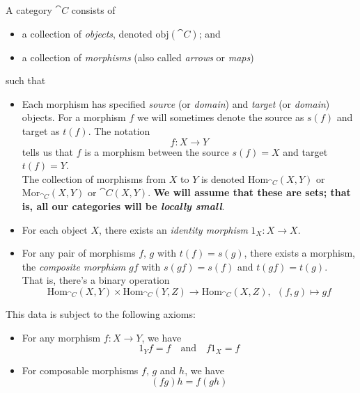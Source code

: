 \vspace*{1em}

\begin{definition}
A category $\cat{C}$ consists of
\begin{itemize}
\item a collection of \emph{objects}, denoted $\mathrm{obj}(\cat{C})$; and
\item a collection of \emph{morphisms} (also called \emph{arrows} or \emph{maps})
\end{itemize}
such that
\begin{itemize}
\item Each morphism has specified \emph{source} (or \emph{domain}) and \emph{target} (or \emph{domain}) objects. For a morphism $f$ we will sometimes denote the source as $s(f)$ and target as $t(f)$. The notation \[f:X \to Y\] tells us that $f$ is a morphism between the source $s(f) = X$ and target $t(f) = Y$.\\[0.5em]
The collection of morphisms from $X$ to $Y$ is denoted $\mathrm{Hom}_{\cat{C}}(X,Y)$ or $\mathrm{Mor}_{\cat{C}}(X,Y)$ or $\cat{C}(X,Y)$. {\bf We will assume that these are sets; that is, all our categories will be \emph{locally small}}.
\item For each object $X$, there exists an \emph{identity morphism} $1_X: X \to X$.
\item For any pair of morphisms $f,\,g$ with $t(f) = s(g)$, there exists a morphism, the \emph{composite morphism} $gf$ with $s(gf) = s(f)$ and $t(gf) = t(g)$.\\[0.5em] That is, there's a binary operation
\[\mathrm{Hom}_{\cat{C}}(X,Y) \times \mathrm{Hom}_{\cat{C}}(Y,Z) \to \mathrm{Hom}_{\cat{C}}(X,Z),\ \ (f,g) \mapsto gf\]
\end{itemize}
This data is subject to the following axioms:
\begin{itemize}
\item For any morphism $f:X \to Y$, we have \[1_Yf = f\quad \text{and} \quad f1_X = f\]
\item For composable morphisms $f,\,g$ and $h$, we have
\[(fg)h = f(gh)\]
\end{itemize}
\end{definition}

\vspace{0.1in}

